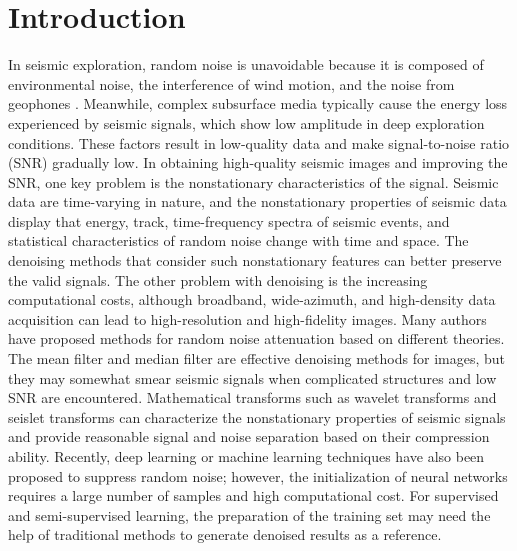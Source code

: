 \section{Introduction}

In seismic exploration, random noise is unavoidable because it is
composed of environmental noise, the interference of wind motion, and
the noise from geophones \cite{Yilmaz01}. Meanwhile, complex
subsurface media typically cause the energy loss experienced by
seismic signals, which show low amplitude in deep exploration
conditions. These factors result in low-quality data and make
signal-to-noise ratio (SNR) gradually low. In obtaining high-quality
seismic images and improving the SNR, one key problem is the
nonstationary characteristics of the signal. Seismic data are
time-varying in nature, and the nonstationary properties of seismic
data display that energy, track, time-frequency spectra of seismic
events, and statistical characteristics of random noise change with
time and space. The denoising methods that consider such nonstationary
features can better preserve the valid signals.  The other problem
with denoising is the increasing computational costs, although
broadband, wide-azimuth, and high-density data acquisition can lead to
high-resolution and high-fidelity images.  Many authors have proposed
methods for random noise attenuation based on different theories. The
mean filter \cite{Bonar12} and median filter \cite{Liu09, Wu18} are
effective denoising methods for images, but they may somewhat smear
seismic signals when complicated structures and low SNR are
encountered. Mathematical transforms such as wavelet transforms
\cite{Berkner98, Yu07, Langston19} and seislet transforms
\cite{Fomel10, Liu10, Liu15vd} can characterize the nonstationary
properties of seismic signals and provide reasonable signal and noise
separation based on their compression ability. Recently, deep learning
or machine learning techniques \cite{Djarfour14, Kimiarfar16, Yu19,
  Zhu19} have also been proposed to suppress random noise; however,
the initialization of neural networks requires a large number of
samples and high computational cost. For supervised and
semi-supervised learning, the preparation of the training set may need
the help of traditional methods to generate denoised results as a
reference.

